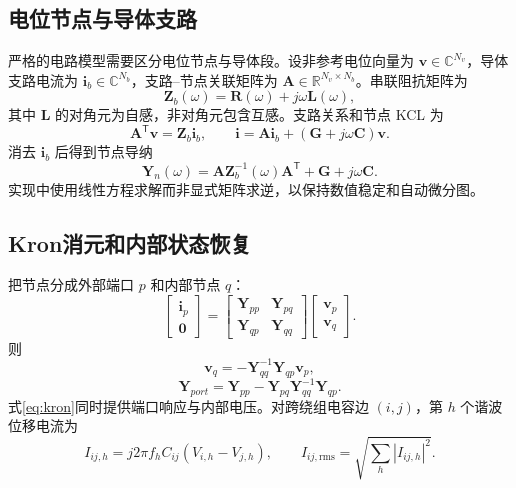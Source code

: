 \documentclass[UTF8,11pt,a4paper]{ctexart}
\newcommand{\mat}[1]{\bm{#1}}
\newcommand{\vect}[1]{\bm{#1}}
\newcommand{\R}{\mathbb{R}}
\newcommand{\C}{\mathbb{C}}
\begin{document}
\subsection{电位节点与导体支路}
严格的电路模型需要区分电位节点与导体段。设非参考电位向量为 $\vect v\in\C^{N_v}$，导体支路电流为 $\vect i_b\in\C^{N_b}$，支路--节点关联矩阵为 $\mat A\in\R^{N_v\times N_b}$。串联阻抗矩阵为
\begin{equation}
\mat Z_b(\omega)=\mat R(\omega)+j\omega\mat L(\omega),
\end{equation}
其中 $\mat L$ 的对角元为自感，非对角元包含互感。支路关系和节点 KCL 为
\begin{equation}
\mat A^{\mathsf T}\vect v=\mat Z_b\vect i_b,
\qquad
\vect i=\mat A\vect i_b+(\mat G+j\omega\mat C)\vect v.
\end{equation}
消去 $\vect i_b$ 后得到节点导纳
\begin{equation}
\boxed{\mat Y_n(\omega)=\mat A\mat Z_b^{-1}(\omega)\mat A^{\mathsf T}+\mat G+j\omega\mat C.}
\label{eq:Yn}
\end{equation}
实现中使用线性方程求解而非显式矩阵求逆，以保持数值稳定和自动微分图。

\subsection{Kron消元和内部状态恢复}
把节点分成外部端口 $p$ 和内部节点 $q$：
\begin{equation}
\begin{bmatrix}\vect i_p\\\vect 0\end{bmatrix}=
\begin{bmatrix}\mat Y_{pp}&\mat Y_{pq}\\\mat Y_{qp}&\mat Y_{qq}\end{bmatrix}
\begin{bmatrix}\vect v_p\\\vect v_q\end{bmatrix}.
\end{equation}
则
\begin{equation}
\vect v_q=-\mat Y_{qq}^{-1}\mat Y_{qp}\vect v_p,
\end{equation}
\begin{equation}
\boxed{\mat Y_{port}=\mat Y_{pp}-\mat Y_{pq}\mat Y_{qq}^{-1}\mat Y_{qp}.}
\label{eq:kron}
\end{equation}
式\eqref{eq:kron}同时提供端口响应与内部电压。对跨绕组电容边 $(i,j)$，第 $h$ 个谐波位移电流为
\begin{equation}
I_{ij,h}=j2\pi f_h C_{ij}(V_{i,h}-V_{j,h}),
\qquad
I_{ij,\mathrm{rms}}=\sqrt{\sum_h|I_{ij,h}|^2}.
\end{equation}
\end{document}
